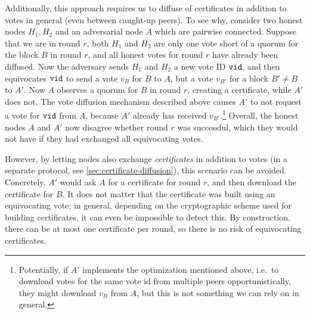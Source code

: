 Additionally, this approach requires us to diffuse of certificates in addition to votes in general (even between caught-up peers).
To see why, consider two honest nodes $H_1,H_2$ and an adversarial node $A$ which are pairwise connected.
Suppose that we are in round $r$, both $H_1$ and $H_2$ are only one vote short of a quorum for the block $B$ in round $r$, and all honest votes for round $r$ have already been diffused.
Now the adversary sends $H_1$ and $H_2$ a new vote ID $\mathtt{vid}$, and then equivocates $\mathtt{vid}$ to send a vote $v_B$ for $B$ to $A$, but a vote $v_{B'}$ for a block $B' \neq B$ to $A'$.
Now $A$ observes a quorum for $B$ in round $r$, creating a certificate, while $A'$ does not.
The vote diffusion mechanism described above causes $A'$ to not request a vote for $\mathtt{vid}$ from $A$, because $A'$ already has received $v_{B'}$.\footnote{Potentially, if $A'$ implements the optimization mentioned above, i.e.\ to download votes for the same vote id from multiple peers opportunistically, they might download $v_B$ from $A$, but this is not something we can rely on in general.}
Overall, the honest nodes $A$ and $A'$ now disagree whether round $r$ was successful, which they would not have if they had exchanged all equivocating votes.

However, by letting nodes also exchange \emph{certificates} in addition to votes (in a separate protocol, see \cref{sec:certificate-diffusion}), this scenario can be avoided.
Concretely, $A'$ would ask $A$ for a certificate for round $r$, and then download the certificate for $B$.
It does not matter that the certificate was built using an equivocating vote; in general, depending on the cryptographic scheme used for building certificates, it can even be impossible to detect this.
By construction, there can be at most one certificate per round, so there is no risk of equivocating certificates.



